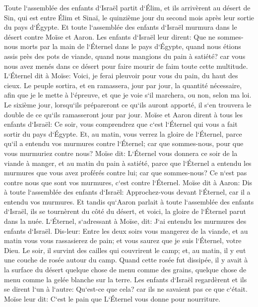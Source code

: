 \verse Toute l`assemblée des enfants d`Israël partit d`Élim, et ils arrivèrent au désert de Sin, qui est entre Élim et Sinaï, le quinzième jour du second mois après leur sortie du pays d`Égypte. 
\verse Et toute l`assemblée des enfants d`Israël murmura dans le désert contre Moïse et Aaron. 
\verse Les enfants d`Israël leur dirent: Que ne sommes-nous morts par la main de l`Éternel dans le pays d`Égypte, quand nous étions assis près des pots de viande, quand nous mangions du pain à satiété? car vous nous avez menés dans ce désert pour faire mourir de faim toute cette multitude. 
\verse L`Éternel dit à Moïse: Voici, je ferai pleuvoir pour vous du pain, du haut des cieux. Le peuple sortira, et en ramassera, jour par jour, la quantité nécessaire, afin que je le mette à l`épreuve, et que je voie s`il marchera, ou non, selon ma loi. 
\verse Le sixième jour, lorsqu`ils prépareront ce qu`ils auront apporté, il s`en trouvera le double de ce qu`ils ramasseront jour par jour. 
\verse Moïse et Aaron dirent à tous les enfants d`Israël: Ce soir, vous comprendrez que c`est l`Éternel qui vous a fait sortir du pays d`Égypte. 
\verse Et, au matin, vous verrez la gloire de l`Éternel, parce qu`il a entendu vos murmures contre l`Éternel; car que sommes-nous, pour que vous murmuriez contre nous? 
\verse Moïse dit: L`Éternel vous donnera ce soir de la viande à manger, et au matin du pain à satiété, parce que l`Éternel a entendu les murmures que vous avez proférés contre lui; car que sommes-nous? Ce n`est pas contre nous que sont vos murmures, c`est contre l`Éternel. 
\verse Moïse dit à Aaron: Dis à toute l`assemblée des enfants d`Israël: Approchez-vous devant l`Éternel, car il a entendu vos murmures. 
\verse Et tandis qu`Aaron parlait à toute l`assemblée des enfants d`Israël, ils se tournèrent du côté du désert, et voici, la gloire de l`Éternel parut dans la nuée. 
\verse L`Éternel, s`adressant à Moïse, dit: 
\verse J`ai entendu les murmures des enfants d`Israël. Dis-leur: Entre les deux soirs vous mangerez de la viande, et au matin vous vous rassasierez de pain; et vous saurez que je suis l`Éternel, votre Dieu. 
\verse Le soir, il survint des cailles qui couvrirent le camp; et, au matin, il y eut une couche de rosée autour du camp. 
\verse Quand cette rosée fut dissipée, il y avait à la surface du désert quelque chose de menu comme des grains, quelque chose de menu comme la gelée blanche sur la terre. 
\verse Les enfants d`Israël regardèrent et ils se dirent l`un à l`autre: Qu`est-ce que cela? car ils ne savaient pas ce que c`était. Moïse leur dit: C`est le pain que L`Éternel vous donne pour nourriture. 
